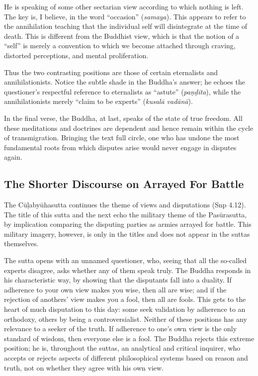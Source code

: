 \documentclass[12pt,openany]{book}%
\begin{document}
He is speaking of some other sectarian view according to which nothing is left. The key is, I believe, in the word “occasion” (\textit{samaya}). This appears to refer to the annihilation teaching that the individual self will disintegrate at the time of death. This is different from the Buddhist view, which is that the notion of a “self” is merely a convention to which we become attached through craving, distorted perceptions, and mental proliferation.

Thus the two contrasting positions are those of certain eternalists and annihilationists. Notice the subtle shade in the Buddha’s answer; he echoes the questioner’s respectful reference to eternalists as “astute” (\textit{\textsanskrit{paṇḍita}}), while the annihilationists merely “claim to be experts” (\textit{\textsanskrit{kusalā} \textsanskrit{vadānā}}).

In the final verse, the Buddha, at last, speaks of the state of true freedom. All these meditations and doctrines are dependent and hence remain within the cycle of transmigration. Bringing the text full circle, one who has undone the most fundamental roots from which disputes arise would never engage in disputes again.

\subsection*{The Shorter Discourse on Arrayed For Battle}

The \textsanskrit{Cūḷabyūhasutta} continues the theme of views and disputations (Snp 4.12). The title of this sutta and the next echo the military theme of the \textsanskrit{Pasūrasutta}, by implication comparing the disputing parties as armies arrayed for battle. This military imagery, however, is only in the titles and does not appear in the suttas themselves.

The sutta opens with an unnamed questioner, who, seeing that all the so-called experts disagree, asks whether any of them speak truly. The Buddha responds in his characteristic way, by showing that the disputants fall into a duality. If adherence to your own view makes you wise, then all are wise; and if the rejection of anothers’ view makes you a fool, then all are fools. This gets to the heart of much disputation to this day: some seek validation by adherence to an orthodoxy, others by being a controversialist. Neither of these positions has any relevance to a seeker of the truth. If adherence to one’s own view is the only standard of wisdom, then everyone else is a fool. The Buddha rejects this extreme position; he is, throughout the suttas, an analytical and critical inquirer, who accepts or rejects aspects of different philosophical systems based on reason and truth, not on whether they agree with his own view.
\end{document}
